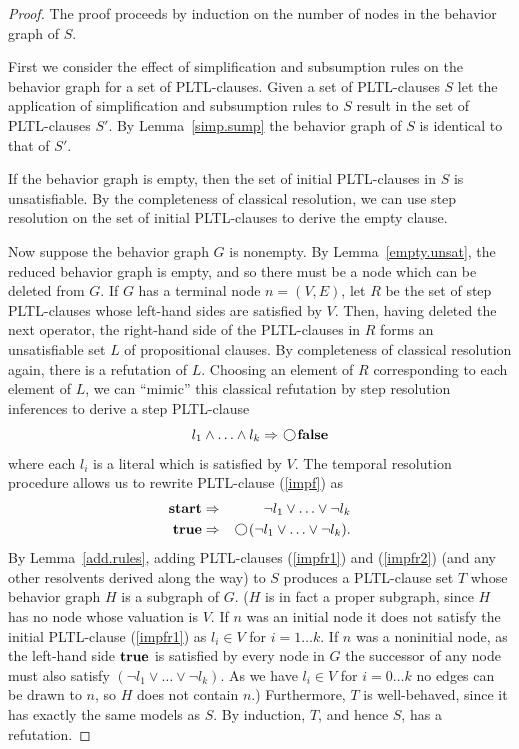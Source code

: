 \documentclass[nohyperref]{acmtrans2f}
\newcommand{\next}{\!\raisebox{-.2ex}{ %
                        \mbox{\unitlength=0.9ex
                        \begin{picture}(2,2)
                        \linethickness{0.06ex}
                        \put(1,1){\circle{2}} %
                        \end{picture}}}       %
                        \,}
\let\imp=\Rightarrow
\def\ltrue{\hbox{\rm\bf true}}
\def\lfalse{\hbox{\rm\bf false}}
\def\lstart{\hbox{\rm\bf start}}
\begin{document}
\begin{proof}
The proof proceeds by induction on the number of nodes in the
behavior graph of $S$. 

First we consider the effect of simplification and subsumption rules on the
behavior graph for a set of PLTL-clauses. 
Given a set of PLTL-clauses $S$ let the application of
simplification and subsumption rules to $S$ result in the set of
PLTL-clauses $S'$. By Lemma~\ref{simp.sump} the behavior graph of $S$ is identical
to that of $S'$. 

If the behavior graph is empty, then the set
of initial PLTL-clauses in $S$ is unsatisfiable. By the completeness of
classical resolution, we can use step resolution on the set of initial
PLTL-clauses to derive the empty clause.

Now suppose the behavior graph $G$ is nonempty. By
Lemma~\ref{empty.unsat}, the reduced behavior graph is empty, and so
there must be a node which can be deleted from $G$. If $G$ has a
terminal node $n = (V,E)$, let $R$ be the set of step PLTL-clauses whose
left-hand sides are satisfied by $V$. Then, having deleted the next
operator, the right-hand side of the PLTL-clauses 
in $R$ forms an unsatisfiable set $L$ of propositional clauses. By
completeness of classical resolution again, there is a refutation of
$L$. Choosing an element of $R$ corresponding to each element of $L$,
we can ``mimic'' this classical refutation by step resolution
inferences to derive a step PLTL-clause
%
\begin{equation}
l_1 \land \ldots \land l_k \imp \next \lfalse \label{impf}
\end{equation}
where each $l_i$ is a literal which is satisfied by $V$. The temporal
resolution procedure allows us to rewrite PLTL-clause (\ref{impf}) as
\begin{eqnarray}
\lstart & \imp & \neg l_1 \lor \ldots \lor \neg l_k \label{impfr1}\\
\ltrue & \imp & \next(\neg l_1 \lor \ldots \lor \neg l_k). \label{impfr2}
\end{eqnarray}
%
By Lemma~\ref{add.rules}, adding PLTL-clauses (\ref{impfr1}) and
(\ref{impfr2}) (and any other resolvents derived along the way) to $S$
produces a PLTL-clause set $T$ whose behavior graph $H$ is a subgraph of
$G$. ($H$ is in fact a proper subgraph, since $H$ has no node whose
valuation is $V$. If $n$ was an initial node it does not satisfy the
initial PLTL-clause (\ref{impfr1}) as $l_i \in V$ for $i=1 \ldots k$. If $n$ was a
noninitial node, as the left-hand side $\ltrue$ is satisfied by every node
in $G$ the successor of any node must also satisfy $(\neg l_1 \lor \ldots \lor
\neg l_k)$. As we have $l_i \in V$ for $i= 0 \ldots k$ no edges can be
drawn to $n$, so $H$ does 
not contain $n$.) Furthermore, $T$ is
well-behaved, since it has 
exactly the same models as $S$. By induction, $T$, and hence $S$, has
a refutation.


\end{proof}
\end{document}
